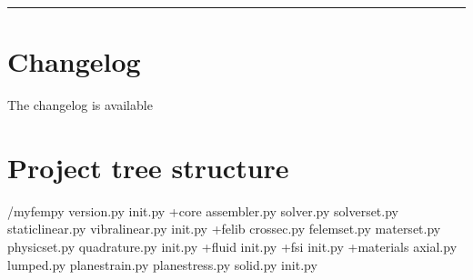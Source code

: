 \documentclass[letterpaper,10pt,english]{sphinxmanual}
\begin{document}
\bigskip\hrule\bigskip



\chapter{Changelog}
\label{\detokenize{index:changelog}}
\sphinxAtStartPar
The changelog is available


\chapter{Project tree structure}
\label{\detokenize{index:project-tree-structure}}
\begin{sphinxVerbatim}[commandchars=\\\{\}]
/myfempy
version.py
\PYGZus{}\PYGZus{}init\PYGZus{}\PYGZus{}.py
+\PYGZhy{}\PYGZhy{}\PYGZhy{}core
assembler.py
solver.py
solverset.py
staticlinear.py
vibralinear.py
\PYGZus{}\PYGZus{}init\PYGZus{}\PYGZus{}.py
+\PYGZhy{}\PYGZhy{}\PYGZhy{}felib
crossec.py
felemset.py
materset.py
physicset.py
quadrature.py
\PYGZus{}\PYGZus{}init\PYGZus{}\PYGZus{}.py
+\PYGZhy{}\PYGZhy{}\PYGZhy{}fluid
\PYGZus{}\PYGZus{}init\PYGZus{}\PYGZus{}.py
+\PYGZhy{}\PYGZhy{}\PYGZhy{}fsi
\PYGZus{}\PYGZus{}init\PYGZus{}\PYGZus{}.py
+\PYGZhy{}\PYGZhy{}\PYGZhy{}materials
axial.py
lumped.py
planestrain.py
planestress.py
solid.py
\PYGZus{}\PYGZus{}init\PYGZus{}\PYGZus{}.py

\end{sphinxVerbatim}
\end{document}
